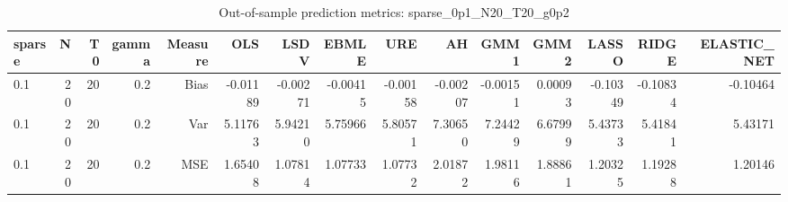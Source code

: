\begin{table}[!htbp]\centering
\caption{Out-of-sample prediction metrics: sparse_0p1_N20_T20_g0p2}
\label{tab:table3_sparse_0p1_N20_T20_g0p2}
\begin{tabular}{lrrrrrrrrrrrrrr}
\hline
sparse & N & T0 & gamma & Measure & OLS & LSDV & EBMLE & URE & AH & GMM1 & GMM2 & LASSO & RIDGE & ELASTIC_NET \\
\hline
0.1 & 20 & 20 & 0.2 & Bias & -0.01189 & -0.00271 & -0.00415 & -0.00158 & -0.00207 & -0.00151 & 0.00093 & -0.10349 & -0.10834 & -0.10464 \\
0.1 & 20 & 20 & 0.2 & Var & 5.11763 & 5.94210 & 5.75966 & 5.80571 & 7.30650 & 7.24429 & 6.67999 & 5.43733 & 5.41841 & 5.43171 \\
0.1 & 20 & 20 & 0.2 & MSE & 1.65408 & 1.07814 & 1.07733 & 1.07732 & 2.01872 & 1.98116 & 1.88861 & 1.20325 & 1.19288 & 1.20146 \\
\hline
\end{tabular}
\end{table}

